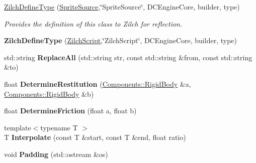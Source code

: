 \begin{DoxyCompactItemize}
\item 
\hypertarget{namespaceDCEngine_a88fd27000cf46ecb3e7c1998a9542148}{\hyperlink{namespaceDCEngine_a88fd27000cf46ecb3e7c1998a9542148}{Zilch\-Define\-Type} (\hyperlink{classDCEngine_1_1SpriteSource}{Sprite\-Source},\char`\"{}Sprite\-Source\char`\"{}, D\-C\-Engine\-Core, builder, type)}\label{namespaceDCEngine_a88fd27000cf46ecb3e7c1998a9542148}

\begin{DoxyCompactList}\small\item\em Provides the definition of this class to Zilch for reflection. \end{DoxyCompactList}\item 
\hypertarget{namespaceDCEngine_add812c17769c2e473bc67d1bd2754d05}{{\bfseries Zilch\-Define\-Type} (\hyperlink{classDCEngine_1_1ZilchScript}{Zilch\-Script},\char`\"{}Zilch\-Script\char`\"{}, D\-C\-Engine\-Core, builder, type)}\label{namespaceDCEngine_add812c17769c2e473bc67d1bd2754d05}

\item 
\hypertarget{namespaceDCEngine_a689dfa99c3966cd9a09032ddc1a0b3a3}{std\-::string {\bfseries Replace\-All} (std\-::string str, const std\-::string \&from, const std\-::string \&to)}\label{namespaceDCEngine_a689dfa99c3966cd9a09032ddc1a0b3a3}

\item 
\hypertarget{namespaceDCEngine_adaaf75b0e2f03cc6fd2ac68d8d406c98}{float {\bfseries Determine\-Restitution} (\hyperlink{classDCEngine_1_1Components_1_1RigidBody}{Components\-::\-Rigid\-Body} \&a, \hyperlink{classDCEngine_1_1Components_1_1RigidBody}{Components\-::\-Rigid\-Body} \&b)}\label{namespaceDCEngine_adaaf75b0e2f03cc6fd2ac68d8d406c98}

\item 
\hypertarget{namespaceDCEngine_a11f716282f71ca8b2386356c182b7d13}{float {\bfseries Determine\-Friction} (float a, float b)}\label{namespaceDCEngine_a11f716282f71ca8b2386356c182b7d13}

\item 
\hypertarget{namespaceDCEngine_a6ca73acb8bf27a76bb6f3f35ad4b1986}{{\footnotesize template$<$typename T $>$ }\\T {\bfseries Interpolate} (const T \&start, const T \&end, float ratio)}\label{namespaceDCEngine_a6ca73acb8bf27a76bb6f3f35ad4b1986}

\item 
\hypertarget{namespaceDCEngine_a91d765b8b565c71355d1f958dd70003f}{void {\bfseries Padding} (std\-::ostream \&os)}\label{namespaceDCEngine_a91d765b8b565c71355d1f958dd70003f}


\end{DoxyCompactItemize}
